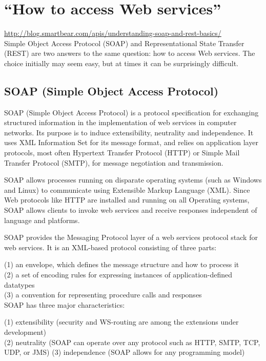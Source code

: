 \documentclass[11pt]{article}
\begin{document}
\newpage
\section{``How to access Web services''}
\href{http://blog.smartbear.com/apis/understanding-soap-and-rest-basics/}{http://blog.smartbear.com/apis/understanding-soap-and-rest-basics/}\\
Simple Object Access Protocol (SOAP) and Representational State Transfer (REST) are two answers to the same question: how to access Web services. The choice initially may seem easy, but at times it can be surprisingly difficult.

\subsection{SOAP (Simple Object Access Protocol)} 
SOAP (Simple Object Access Protocol) is a protocol specification for
exchanging structured information in the implementation of web
services in computer networks. Its purpose is to induce extensibility,
neutrality and independence. It uses XML Information Set for its
message format, and relies on application layer protocols, most often
Hypertext Transfer Protocol (HTTP) or Simple Mail Transfer Protocol
(SMTP), for message negotiation and transmission.

SOAP allows processes running on disparate operating systems (such as
Windows and Linux) to communicate using Extensible Markup Language
(XML). Since Web protocols like HTTP are installed and running on all
Operating systems, SOAP allows clients to invoke web services and
receive responses independent of language and platforms.

SOAP provides the Messaging Protocol layer of a web services protocol stack for web services. It is an XML-based protocol consisting of three parts:

(1) an envelope, which defines the message structure and how to process it\\
(2) a set of encoding rules for expressing instances of application-defined datatypes\\
(3) a convention for representing procedure calls and responses\\

SOAP has three major characteristics:

(1) extensibility (security and WS-routing are among the extensions under development)\\
(2) neutrality (SOAP can operate over any protocol such as HTTP, SMTP, TCP, UDP, or JMS)
(3) independence (SOAP allows for any programming model)
\end{document}
